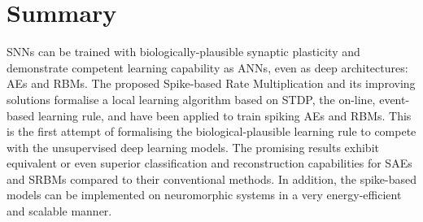 
\section{Summary}
SNNs can be trained with biologically-plausible synaptic plasticity and demonstrate competent learning capability as ANNs, even as deep architectures: AEs and RBMs.
The proposed Spike-based Rate Multiplication and its improving solutions formalise a local learning algorithm based on STDP, the on-line, event-based learning rule, and have been applied to train spiking AEs and RBMs.
This is the first attempt of formalising the biological-plausible learning rule to compete with the unsupervised deep learning models.
The promising results exhibit equivalent or even superior classification and reconstruction capabilities for SAEs and SRBMs compared to their conventional methods.
In addition, the spike-based models can be implemented on neuromorphic systems in a very energy-efficient and scalable manner.
